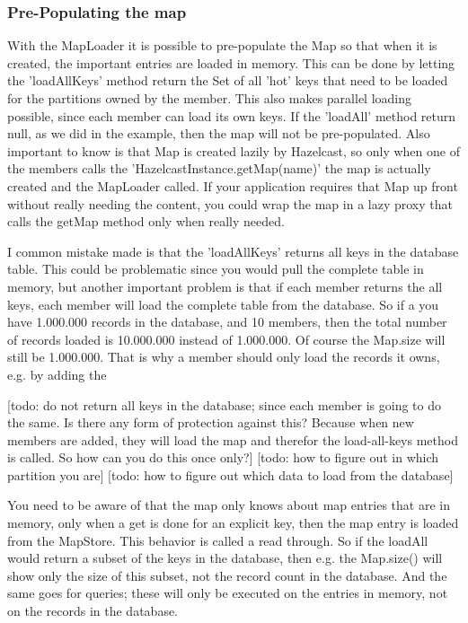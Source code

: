 \subsubsection{Pre-Populating the map}
With the MapLoader it is possible to pre-populate the Map so that when it is created, the important entries are loaded in memory. This can be done by letting the 'loadAllKeys' method return the Set of all 'hot' keys that need to be loaded for the partitions owned by the member. This also makes parallel loading possible, since each member can load its own keys.  If the 'loadAll' method return null, as we did in the example, then the map will not be pre-populated. Also important to know is that Map is created lazily by Hazelcast, so only when one of the members calls the 'HazelcastInstance.getMap(name)' the map is actually created and the MapLoader called. If your application requires that Map up front without really needing the content, you could wrap the map in a lazy proxy that calls the getMap method only when really needed.

I common mistake made is that the 'loadAllKeys' returns all keys in the database table. This could be problematic since you would pull the complete table in memory, but another important problem is that if each member returns the all keys, each member will load the complete table from the database. So if a you have 1.000.000 records in the database, and 10 members, then the total number of records loaded is 10.000.000 instead of 1.000.000. Of course the Map.size will still be 1.000.000. That is why a member should only load the records it owns, e.g. by adding the 

[todo: do not return all keys in the database; since each member is going to do the same. Is there any form of protection against this? Because when new members are added, they will load the map and therefor the load-all-keys method is called. So how can you do this once only?]
[todo: how to figure out in which partition you are]
[todo: how to figure out which data to load from the database]

You need to be aware of that the map only knows about map entries that are in memory, only when a get is done for an explicit key, then the map entry is loaded from the MapStore. This behavior is called a read through. So if the loadAll would return a subset of the keys in the database, then e.g. the Map.size() will show only the size of this subset, not the record count in the database. And the same goes for queries; these will only be executed on the entries in memory, not on the records in the database.

